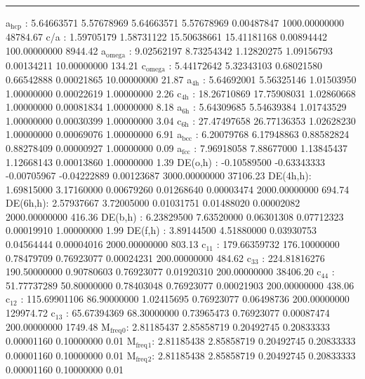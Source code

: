 \documentclass[11pt]{article}
\begin{document}
\noindent\rule{\textwidth}{0.5pt}
a\(_{\text{hcp}}\)   :   5.64663571   5.57678969   5.64663571   5.57678969   0.00487847 1000.00000000     48784.67
c/a     :   1.59705179   1.58731122  15.50638661  15.41181168   0.00894442 100.00000000      8944.42
a\(_{\text{omega}}\) :   9.02562197   8.73254342   1.12820275   1.09156793   0.00134211  10.00000000       134.21
c\(_{\text{omega}}\) :   5.44172642   5.32343103   0.68021580   0.66542888   0.00021865  10.00000000        21.87
a\(_{\text{4h}}\)    :   5.64692001   5.56325146   1.01503950   1.00000000   0.00022619   1.00000000         2.26
c\(_{\text{4h}}\)    :  18.26710869  17.75908031   1.02860668   1.00000000   0.00081834   1.00000000         8.18
a\(_{\text{6h}}\)    :   5.64309685   5.54639384   1.01743529   1.00000000   0.00030399   1.00000000         3.04
c\(_{\text{6h}}\)    :  27.47497658  26.77136353   1.02628230   1.00000000   0.00069076   1.00000000         6.91
a\(_{\text{bcc}}\)   :   6.20079768   6.17948863   0.88582824   0.88278409   0.00000927   1.00000000         0.09
a\(_{\text{fcc}}\)   :   7.96918058   7.88677000   1.13845437   1.12668143   0.00013860   1.00000000         1.39
DE(o,h) :  -0.10589500  -0.63343333  -0.00705967  -0.04222889   0.00123687 3000.00000000     37106.23
DE(4h,h):   1.69815000   3.17160000   0.00679260   0.01268640   0.00003474 2000.00000000       694.74
DE(6h,h):   2.57937667   3.72005000   0.01031751   0.01488020   0.00002082 2000.00000000       416.36
DE(b,h) :   6.23829500   7.63520000   0.06301308   0.07712323   0.00019910   1.00000000         1.99
DE(f,h) :   3.89144500   4.51880000   0.03930753   0.04564444   0.00004016 2000.00000000       803.13
c\(_{\text{11}}\)    : 179.66359732 176.10000000   0.78479709   0.76923077   0.00024231 200.00000000       484.62
c\(_{\text{33}}\)    : 224.81816276 190.50000000   0.90780603   0.76923077   0.01920310 200.00000000     38406.20
c\(_{\text{44}}\)    :  51.77737289  50.80000000   0.78403048   0.76923077   0.00021903 200.00000000       438.06
c\(_{\text{12}}\)    : 115.69901106  86.90000000   1.02415695   0.76923077   0.06498736 200.00000000    129974.72
c\(_{\text{13}}\)    :  65.67394369  68.30000000   0.73965473   0.76923077   0.00087474 200.00000000      1749.48
M\(_{\text{freq}}\)\(_{\text{0}}\):   2.81185437   2.85858719   0.20492745   0.20833333   0.00001160   0.10000000         0.01
M\(_{\text{freq}}\)\(_{\text{1}}\):   2.81185438   2.85858719   0.20492745   0.20833333   0.00001160   0.10000000         0.01
M\(_{\text{freq}}\)\(_{\text{2}}\):   2.81185438   2.85858719   0.20492745   0.20833333   0.00001160   0.10000000         0.01
\end{document}

